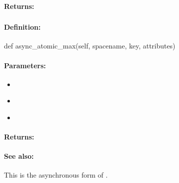 \paragraph{Returns:}


\pagebreak
\subsubsection{}
\label{api:python:async_atomic_max}


\paragraph{Definition:}
\begin{pythoncode}
def async_atomic_max(self, spacename, key, attributes)
\end{pythoncode}

\paragraph{Parameters:}
\begin{itemize}[noitemsep]
\item {}\\

\item {}\\

\item {}\\

\end{itemize}

\paragraph{Returns:}


\paragraph{See also:}  This is the asynchronous form of .

\pagebreak
\subsubsection{}
\label{api:python:cond_atomic_max}


